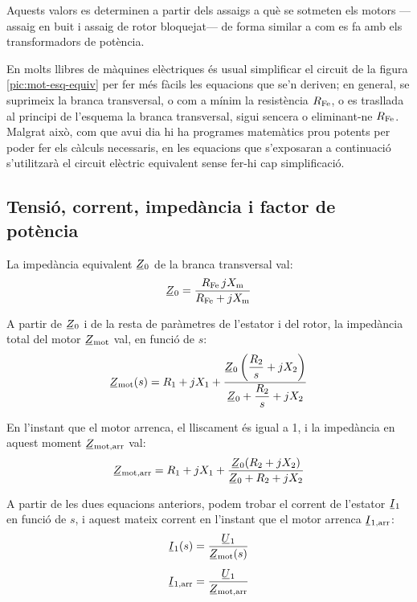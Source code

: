 Aquests valors es determinen a partir dels assaigs a què se sotmeten els motors ---assaig en buit i assaig de rotor bloquejat--- de forma similar a com es fa amb els transformadors de potència.

En molts llibres de màquines elèctriques és usual simplificar el circuit de la figura  \vref{pic:mot-esq-equiv} per fer més fàcils les equacions que se'n deriven; en general, se suprimeix la branca transversal, o com a mínim la resistència $R_\mathrm{Fe}$, o es trasllada al principi de l'esquema la branca transversal, sigui sencera o eliminant-ne  $R_\mathrm{Fe}$. Malgrat això, com que avui dia hi ha programes matemàtics prou potents per poder fer els càlculs necessaris, en les equacions que s'exposaran a continuació s'utilitzarà el circuit elèctric equivalent sense fer-hi cap simplificació.

\subsection{Tensió, corrent, impedància i factor de potència}\label{sec:mot-u-c-i}

La impedància equivalent $\cmplx{Z}_0$ de la branca transversal val:
\begin{equation}\label{eq:mot-Z0}
    \cmplx{Z}_0 = \frac{R\ped{Fe} \, j X\ped{m}}{ R\ped{Fe} + j X\ped{m}}
\end{equation}

A partir de $\cmplx{Z}_0$ i de la resta de paràmetres de l'estator i del rotor, la impedància total del motor $\cmplx{Z}\ped{mot}$ val,  en funció de $s$:
\begin{equation}\label{eq:mot-Zmot}\index{motors d'inducció!impedància}
    \cmplx{Z}\ped{mot}(s) = R_1 + j X_1 + \frac{\cmplx{Z}_0 \left( \dfrac{R_2}{s} + j X_2\right)}{\cmplx{Z}_0 +  \dfrac{R_2}{s} + j X_2}
\end{equation}

En l'instant que el motor arrenca, el lliscament és igual a 1, i la impedància en aquest moment $\cmplx{Z}\ped{mot,arr}$ val:
\begin{equation}\label{eq:z-mot-arr}
    \cmplx{Z}\ped{mot,arr} = R_1 + j X_1 + \frac{\cmplx{Z}_0 ( R_2 + j X_2)}{\cmplx{Z}_0 +  R_2 + j X_2}
\end{equation}

A partir de les dues equacions anteriors, podem trobar el corrent de l'estator  $\cmplx{I}_1$ en funció de $s$, i aquest mateix corrent en l'instant que el motor arrenca $\cmplx{I}\ped{1,arr}$:
\begin{subequations}\index{motors d'inducció!corrent d'arrencada}\index{motors d'inducció!corrent}
\begin{align}
    \cmplx{I}_1(s) &= \frac{\cmplx{U}_1}{\cmplx{Z}\ped{mot}(s)}\label{eq:I1-mot} \\[1ex]
    \cmplx{I}\ped{1,arr} &= \frac{\cmplx{U}_1}{\cmplx{Z}\ped{mot,arr}}\label{eq:I1-mot-arr}
\end{align}
\end{subequations}

